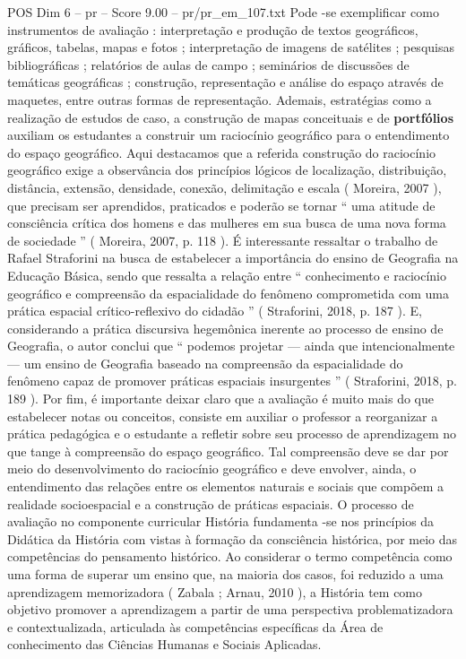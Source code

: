 \begin{textsample}{POS Dim 6 – pr – Score 9.00 – pr/pr\_em\_107.txt}
Pode -se exemplificar como instrumentos de avaliação : interpretação e produção de textos geográficos, gráficos, tabelas, mapas e fotos ; interpretação de imagens de satélites ; pesquisas bibliográficas ; relatórios de aulas de campo ; seminários de discussões de temáticas geográficas ; construção, representação e análise do espaço através de maquetes, entre outras formas de representação.
Ademais, estratégias como a realização de estudos de caso, a construção de mapas conceituais e de \textbf{portfólios} auxiliam os estudantes a construir um raciocínio geográfico para o entendimento do espaço geográfico.
Aqui destacamos que a referida construção do raciocínio geográfico exige a observância dos princípios lógicos de localização, distribuição, distância, extensão, densidade, conexão, delimitação e escala ( Moreira, 2007 ), que precisam ser aprendidos, praticados e poderão se tornar “ uma atitude de consciência crítica dos homens e das mulheres em sua busca de uma nova forma de sociedade ” ( Moreira, 2007, p. 118 ).
É interessante ressaltar o trabalho de Rafael Straforini na busca de estabelecer a importância do ensino de Geografia na Educação Básica, sendo que ressalta a relação entre “ conhecimento e raciocínio geográfico e compreensão da espacialidade do fenômeno comprometida com uma prática espacial crítico-reflexivo do cidadão ” ( Straforini, 2018, p. 187 ).
E, considerando a prática discursiva hegemônica inerente ao processo de ensino de Geografia, o autor conclui que “ podemos projetar — ainda que intencionalmente — um ensino de Geografia baseado na compreensão da espacialidade do fenômeno capaz de promover práticas espaciais insurgentes ” ( Straforini, 2018, p. 189 ).
Por fim, é importante deixar claro que a avaliação é muito mais do que estabelecer notas ou conceitos, consiste em auxiliar o professor a reorganizar a prática pedagógica e o estudante a refletir sobre seu processo de aprendizagem no que tange à compreensão do espaço geográfico.
Tal compreensão deve se dar por meio do desenvolvimento do raciocínio geográfico e deve envolver, ainda, o entendimento das relações entre os elementos naturais e sociais que compõem a realidade socioespacial e a construção de práticas espaciais.
O processo de avaliação no componente curricular História fundamenta -se nos princípios da Didática da História com vistas à formação da consciência histórica, por meio das competências do pensamento histórico.
Ao considerar o termo competência como uma forma de superar um ensino que, na maioria dos casos, foi reduzido a uma aprendizagem memorizadora ( Zabala ; Arnau, 2010 ), a História tem como objetivo promover a aprendizagem a partir de uma perspectiva problematizadora e contextualizada, articulada às competências específicas da Área de conhecimento das Ciências Humanas e Sociais Aplicadas.

\end{textsample}
